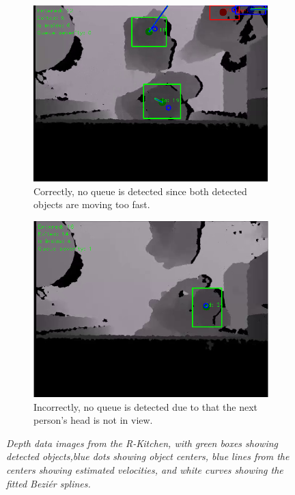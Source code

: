 \begin{figure}[H]
\begin{subfigure}{.4\textwidth}
  \centering
  \includegraphics[width=1.0\linewidth]{images/noQueue2.png}
  \caption{Correctly, no queue is detected since both detected objects are moving too fast.}
  \label{fig:sub5}
\end{subfigure} 
\begin{subfigure}{.4\textwidth}
  \centering
  \includegraphics[width=1.0\linewidth]{images/queueNotDetected.png}
  \caption{Incorrectly, no queue is detected due to that the next person's head is not in view.}
  \label{fig:sub6}
\end{subfigure}%
\caption[Queues]{\textit{Depth data images from the R-Kitchen, with green boxes showing detected objects,blue dots showing object centers, blue lines from the centers showing estimated velocities, and white curves showing the fitted Beziér splines.}}
\label{fig:Queue Detection}
\end{figure}

